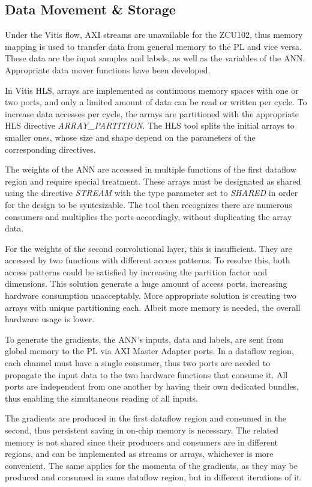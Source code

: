 \subsection{Data Movement \& Storage}
Under the Vitis flow, AXI streams are unavailable for the ZCU102, thus memory mapping is used to transfer data from general memory to the PL and vice versa. These data are the input samples and labels, as well as the variables of the ANN. Appropriate data mover functions have been developed. %

In Vitis HLS, arrays are implemented as continuous memory spaces with one or two ports, and only a limited amount of data can be read or written per cycle. To increase data accesses per cycle, the arrays are partitioned with the appropriate HLS directive \emph{ARRAY\_PARTITION}. The HLS tool splits the initial arrays to smaller ones, whose size and shape depend on the parameters of the corresponding directives. %

The weights of the ANN are accessed in multiple functions of the first dataflow region and require special treatment. These arrays must be designated as shared using the directive \emph{STREAM} with the type parameter set to \emph{SHARED} in order for the design to be syntesizable. The tool then recognizes there are numerous consumers and multiplies the ports accordingly, without duplicating the array data. %

For the weights of the second convolutional layer, this is insufficient. They are accessed by two functions with different access patterns. To resolve this, both access patterns could be satisfied by increasing the partition factor and dimensions. This solution generate a huge amount of access ports, increasing hardware consumption unacceptably. More appropriate solution is creating two arrays with unique partitioning each. Albeit more memory is needed, the overall hardware usage is lower. %

To generate the gradients, the ANN's inputs, data and labels, are sent from global memory to the PL via AXI Master Adapter ports. In a dataflow region, each channel must have a single consumer, thus two ports are needed to propagate the input data to the two hardware functions that consume it. All ports are independent from one another by having their own dedicated bundles, thus enabling the simultaneous reading of all inputs. %

The gradients are produced in the first dataflow region and consumed in the second, thus persistent saving in on-chip memory is necessary. The related memory is not shared since their producers and consumers are in different regions, and can be implemented as streams or arrays, whichever is more convenient. The same applies for the momenta of the gradients, as they may be produced and consumed in same dataflow region, but in different iterations of it. %

